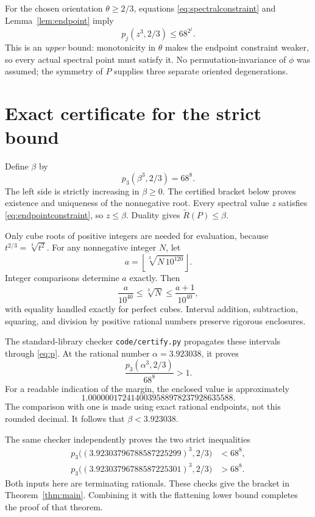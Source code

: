 \documentclass[11pt]{article}
\newcommand{\AR}{\widetilde{R}}
\theoremstyle{definition}\newtheorem{definition}[theorem]{Definition}
\theoremstyle{remark}\newtheorem{remark}[theorem]{Remark}
\begin{document}
For the chosen orientation $\theta\geq2/3$, equations
\eqref{eq:spectralconstraint} and Lemma~\ref{lem:endpoint} imply
\begin{equation}\label{eq:endpointconstraint}
p_j(z^3,2/3)\leq68^{2^j}.
\end{equation}
This is an \emph{upper} bound: monotonicity in $\theta$ makes the endpoint
constraint weaker, so every actual spectral point must satisfy it.
No permutation-invariance of $\phi$ was assumed; the symmetry of $P$ supplies
three separate oriented degenerations.

\section{Exact certificate for the strict bound}\label{sec:certificate}
Define $\beta$ by
\begin{equation}\label{eq:beta}
p_3(\beta^3,2/3)=68^8.
\end{equation}
The left side is strictly increasing in $\beta\geq0$. The certified bracket
below proves existence and uniqueness of the nonnegative root.
Every spectral value $z$ satisfies \eqref{eq:endpointconstraint}, so
$z\leq\beta$. Duality gives $\AR(P)\leq\beta$.

Only cube roots of positive integers are needed for evaluation, because
$t^{2/3}=\sqrt[3]{t^2}$. For any nonnegative integer $N$, let
\[
a=\left\lfloor\sqrt[3]{N\,10^{120}}\right\rfloor.
\]
Integer comparisons determine $a$ exactly. Then
\[
\frac{a}{10^{40}}\leq\sqrt[3]{N}\leq\frac{a+1}{10^{40}},
\]
with equality handled exactly for perfect cubes. Interval addition,
subtraction, squaring, and division by positive rational numbers preserve
rigorous enclosures.

The standard-library checker \texttt{code/certify.py} propagates these intervals
through \eqref{eq:p}. At the rational number $\alpha=3.923038$, it proves
\[
\frac{p_3(\alpha^3,2/3)}{68^8}>1.
\]
For a readable indication of the margin, the enclosed value is approximately
\[
1.0000001724140039588978237928635588.
\]
The comparison with one is made using exact rational endpoints, not this
rounded decimal. It follows that $\beta<3.923038$.

The same checker independently proves the two strict inequalities
\begin{align*}
p_3\bigl((3.92303796788587225299)^3,2/3\bigr)&<68^8,\\
p_3\bigl((3.92303796788587225301)^3,2/3\bigr)&>68^8.
\end{align*}
Both inputs here are terminating rationals. These checks give the bracket in
Theorem~\ref{thm:main}. Combining it with the flattening lower bound completes
the proof of that theorem.
\end{document}
